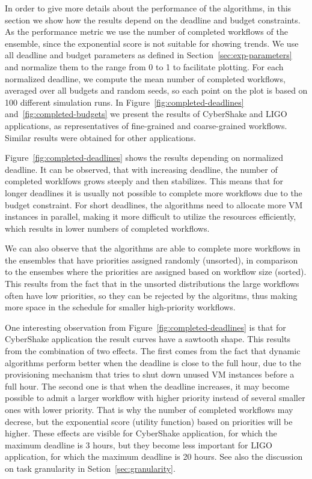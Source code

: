 \documentclass[preprint,5p]{elsarticle}
\begin{document}
In order to give more details about the performance of the algorithms, in this
section we show how the results depend on the deadline and budget constraints.
As the performance metric we use the number of completed workflows of the
ensemble, since the exponential score is not suitable for showing trends.
We use all deadline and budget parameters as defined in
Section~\ref{sec:exp-parameters} and normalize them to the range from 0 to 1 to
facilitate plotting.
For each normalized deadline, we compute the mean number of completed workflows,
averaged over all budgets and random seeds, so each point on the plot is based
on 100 different simulation runs. In Figure~\ref{fig:completed-deadlines}
and~\ref{fig:completed-budgets} we present the results of CyberShake and LIGO
applications, as representatives of fine-grained and coarse-grained workflows.
Similar results were obtained for other applications.

Figure~\ref{fig:completed-deadlines} shows the results depending on normalized
deadline. It can be observed, that with increasing deadline, the number of
completed worklfows grows steeply and then stabilizes. This means that for
longer deadlines it is usually not possible to complete more workflows due to
the budget constraint. For short deadlines, the algorithms need to allocate more
VM instances in parallel, making it more difficult to utilize the resources
efficiently, which results in lower numbers of completed workflows.

We can also observe that the algorithms are able to complete more workflows in
the ensembles that have priorities assigned randomly (unsorted), in comparison
to the ensembes where the priorities are assigned based on workflow size
(sorted). This results from the fact that in the unsorted distributions the large
workflows often have low priorities, so they can be rejected by the algoritms,
thus making more space in the schedule for smaller high-priority workflows.

One interesting observation from Figure~\ref{fig:completed-deadlines} is that for
CyberShake application the result curves have a sawtooth shape. This results
from the combination of two effects. The first comes from the fact that dynamic
algorithms perform better when the deadline is close to the full hour, due to
the provisioning mechanism that tries to shut down unused VM instances before a
full hour. The second one is that when the deadline increases, it may become
possible to admit a larger workflow with higher priority instead of several
smaller ones with lower priority. That is why the number of completed workflows
may decrese, but the exponential score (utility function) based on priorities
will be higher. These effects are visible for CyberShake application, for which
the maximum deadline is 3 hours, but they become less important for LIGO
application, for which the maximum deadline is 20 hours. See also the discussion
on task granularity in Setion~\ref{sec:granularity}.
\end{document}
